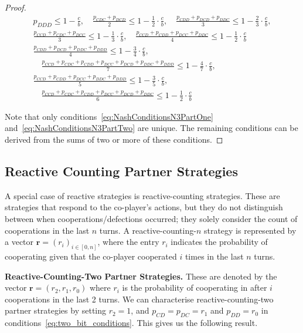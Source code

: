 \documentclass{article}
\theoremstyle{definition}
\begin{document}
\begin{proof}
\begin{align}
  p_{DDD} \leq 1 \!- \!\frac{c}{b},
  \quad \frac{p_{CDC} + p_{DCD}}{2} \leq 1 - \frac{1}{2} \cdot \frac{c}{b}, 
  \quad \frac{p_{CDD} + p_{DCD} + p_{DDC}}{3} \leq 1 - \frac{2}{3} \cdot \frac{c}{b}, \label{eq:NashConditionsN3PartOne} \\[.5em]
  \frac{p_{CCD} + p_{CDC} + p_{DCC}}{3} \leq 1 - \frac{1}{3} \cdot \frac{c}{b},
  \quad \frac{p_{CCD} + p_{CDD} + p_{DCC} + p_{DDC}}{4} \leq 1 - \frac{1}{2}  \cdot \frac{c}{b} \label{eq:NashConditionsN3PartTwo} \\[.5em]
  \frac{p_{CDD} + p_{DCD} + p_{DDC} + p_{DDD}}{4} \leq 1 - \frac{3}{4} \cdot \frac{c}{b}, \\[.5em]
  \quad \frac{p_{CCD} + p_{CDC} + p_{CDD} + p_{DCC} + p_{DCD} + p_{DDC} + p_{DDD}}{7} \leq 1 - \frac{4}{7} \cdot \frac{c}{b}, \\[.5em]
  \frac{p_{CCD} + p_{CDD} + p_{DCC} + p_{DDC} + p_{DDD}}{5} \leq 1 - \frac{3}{5} \cdot \frac{c}{b}, \\[.5em]
  \quad \frac{p_{CCD} + p_{CDC} + p_{CDD} + p_{DCC} + p_{DCD} + p_{DDC}}{6} \leq 1 - \frac{1}{2} \cdot \frac{c}{b}
\end{align}

Note that only conditions~\eqref{eq:NashConditionsN3PartOne}
and~\eqref{eq:NashConditionsN3PartTwo} are unique. The remaining conditions can
be derived from the sums of two or more of these conditions.
\end{proof}


\subsection{Reactive Counting Partner Strategies}

A special case of reactive strategies is reactive-counting strategies. These are
strategies that respond to the co-player's actions, but they do not distinguish
between when cooperations/defections occurred; they solely consider the count of
cooperations in the last $n$ turns. A reactive-counting-$n$ strategy is represented
by a vector $\mathbf{r}=(r_i)_{i \in [0, n]}$, where the entry \(r_i\)
indicates the probability of cooperating given that the co-player cooperated
\(i\) times in the last \(n\) turns.

{\bf Reactive-Counting-Two Partner Strategies.} These are denoted by the vector
$\mathbf{r}=(r_2, r_1, r_0)$ where $r_i$ is the probability of cooperating in
after $i$ cooperations in the last 2 turns. We can characterise reactive-counting-two
partner strategies by setting $r_2 = 1$, and $p_{CD} = p_{DC} = r_1$ and $p_{DD} = r_0$
in conditions~\eqref{eq:two_bit_conditions}. This gives us the following result.
\end{document}
